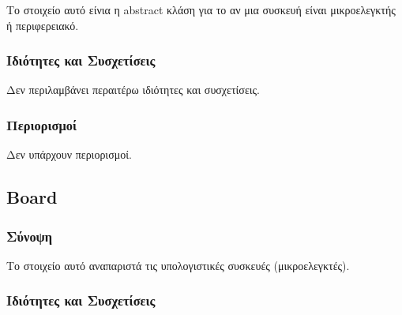 \noindent Το στοιχείο αυτό είνια η abstract κλάση για το αν μια συσκευή είναι μικροελεγκτής ή περιφερειακό.

\subsubsection*{Ιδιότητες και Συσχετίσεις}

\noindent Δεν περιλαμβάνει περαιτέρω ιδιότητες και συσχετίσεις.

\subsubsection*{Περιορισμοί}

\noindent Δεν υπάρχουν περιορισμοί.

\subsection{Board}
\label{subsec:board}

\subsubsection*{Σύνοψη}

\noindent Το στοιχείο αυτό αναπαριστά τις υπολογιστικές συσκευές (μικροελεγκτές).

\subsubsection*{Ιδιότητες και Συσχετίσεις}

